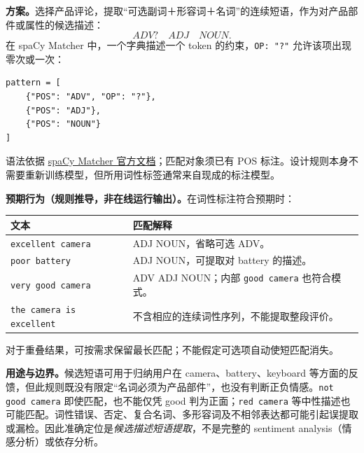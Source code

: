 \begin{checkedsolution}
\textbf{方案。}选择产品评论，提取“可选副词＋形容词＋名词”的连续短语，作为对产品部件或属性的候选描述：
\[
\boxed{ADV?\quad ADJ\quad NOUN}.
\]
在 spaCy Matcher 中，一个字典描述一个 token 的约束，\texttt{OP: "?"} 允许该项出现零次或一次：
\begin{verbatim}
pattern = [
    {"POS": "ADV", "OP": "?"},
    {"POS": "ADJ"},
    {"POS": "NOUN"}
]
\end{verbatim}
语法依据 \href{https://spacy.io/usage/rule-based-matching\#quantifiers}{spaCy Matcher 官方文档}；匹配对象须已有 POS 标注。设计规则本身不需要重新训练模型，但所用词性标签通常来自现成的标注模型。

\textbf{预期行为（规则推导，非在线运行输出）。}在词性标注符合预期时：
\begin{center}
\begin{tabularx}{\textwidth}{@{}lX@{}}
\toprule
文本 & 匹配解释 \\
\midrule
\texttt{excellent camera} & ADJ NOUN，省略可选 ADV。\\
\texttt{poor battery} & ADJ NOUN，可提取对 battery 的描述。\\
\texttt{very good camera} & ADV ADJ NOUN；内部 \texttt{good camera} 也符合模式。\\
\texttt{the camera is excellent} & 不含相应的连续词性序列，不能提取整段评价。\\
\bottomrule
\end{tabularx}
\end{center}
对于重叠结果，可按需求保留最长匹配；不能假定可选项自动使短匹配消失。

\textbf{用途与边界。}候选短语可用于归纳用户在 camera、battery、keyboard 等方面的反馈，但此规则既没有限定“名词必须为产品部件”，也没有判断正负情感。\texttt{not good camera} 即使匹配，也不能仅凭 good 判为正面；\texttt{red camera} 等中性描述也可能匹配。词性错误、否定、复合名词、多形容词及不相邻表达都可能引起误提取或漏检。因此准确定位是\emph{候选描述短语提取}，不是完整的 sentiment analysis（情感分析）或依存分析。
\end{checkedsolution}
